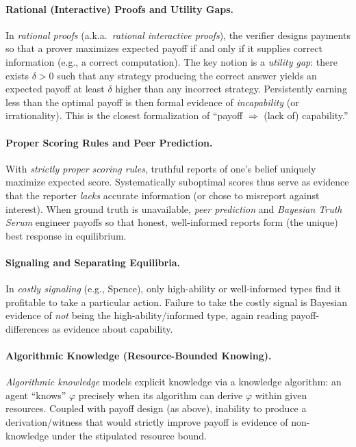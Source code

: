 \paragraph{Rational (Interactive) Proofs and Utility Gaps.}
In \emph{rational proofs} (a.k.a.\ \emph{rational interactive proofs}), the
verifier designs payments so that a prover maximizes expected payoff if and only
if it supplies correct information (e.g., a correct computation). The key
notion is a \emph{utility gap}: there exists $\delta>0$ such that any strategy
producing the correct answer yields an expected payoff at least $\delta$ higher
than any incorrect strategy. Persistently earning less than the optimal payoff
is then formal evidence of \emph{incapability} (or irrationality). This is the
closest formalization of ``payoff $\Rightarrow$ (lack of) capability.''

\paragraph{Proper Scoring Rules and Peer Prediction.}
With \emph{strictly proper scoring rules}, truthful reports of one’s belief
uniquely maximize expected score. Systematically suboptimal scores thus serve as
evidence that the reporter \emph{lacks} accurate information (or chose to
misreport against interest). When ground truth is unavailable, \emph{peer
prediction} and \emph{Bayesian Truth Serum} engineer payoffs so that honest,
well-informed reports form (the unique) best response in equilibrium.

\paragraph{Signaling and Separating Equilibria.}
In \emph{costly signaling} (e.g., Spence), only high-ability or well-informed
types find it profitable to take a particular action. Failure to take the costly
signal is Bayesian evidence of \emph{not} being the high-ability/informed type,
again reading payoff-differences as evidence about capability.

\paragraph{Algorithmic Knowledge (Resource-Bounded Knowing).}
\emph{Algorithmic knowledge} models explicit knowledge via a knowledge algorithm:
an agent ``knows'' $\varphi$ precisely when its algorithm can derive $\varphi$
within given resources. Coupled with payoff design (as above), inability to
produce a derivation/witness that would strictly improve payoff is evidence of
non-knowledge under the stipulated resource bound.

